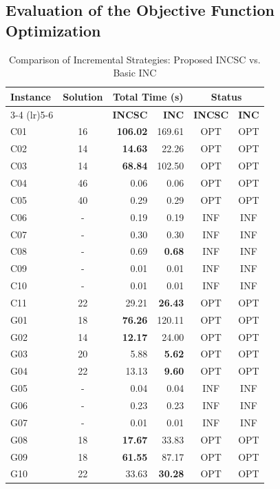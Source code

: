 \documentclass[letterpaper,journal]{IEEEtran}
\begin{document}
\subsection{Evaluation of the Objective Function Optimization}
\begin{table}[htbp]
\centering
\caption{Comparison of Incremental Strategies: Proposed INCSC vs. Basic INC}
\label{tab:inc_vs_incsc}
\begin{tabular}{l c r r c c}
\toprule
\textbf{Instance} & \textbf{Solution} & \multicolumn{2}{c}{\textbf{Total Time (s)}} & \multicolumn{2}{c}{\textbf{Status}} \\
\cmidrule(lr){3-4} \cmidrule(lr){5-6}
 &  & \textbf{INCSC} & \textbf{INC} & \textbf{INCSC} & \textbf{INC} \\
\midrule
C01 & 16 & \textbf{106.02} & 169.61 & OPT & OPT \\
C02 & 14 & \textbf{14.63} & 22.26 & OPT & OPT \\
C03 & 14 & \textbf{68.84} & 102.50 & OPT & OPT \\
C04 & 46 & 0.06 & 0.06 & OPT & OPT \\
C05 & 40 & 0.29 & 0.29 & OPT & OPT \\
C06 & - & 0.19 & 0.19 & INF & INF \\
C07 & - & 0.30 & 0.30 & INF & INF \\
C08 & - & 0.69 & \textbf{0.68} & INF & INF \\
C09 & - & 0.01 & 0.01 & INF & INF \\
C10 & - & 0.01 & 0.01 & INF & INF \\
C11 & 22 & 29.21 & \textbf{26.43} & OPT & OPT \\
G01 & 18 & \textbf{76.26} & 120.11 & OPT & OPT \\
G02 & 14 & \textbf{12.17} & 24.00 & OPT & OPT \\
G03 & 20 & 5.88 & \textbf{5.62} & OPT & OPT \\
G04 & 22 & 13.13 & \textbf{9.60} & OPT & OPT \\
G05 & - & 0.04 & 0.04 & INF & INF \\
G06 & - & 0.23 & 0.23 & INF & INF \\
G07 & - & 0.01 & 0.01 & INF & INF \\
G08 & 18 & \textbf{17.67} & 33.83 & OPT & OPT \\
G09 & 18 & \textbf{61.55} & 87.17 & OPT & OPT \\
G10 & 22 & 33.63 & \textbf{30.28} & OPT & OPT \\

\end{tabular}
\end{table}
\end{document}

